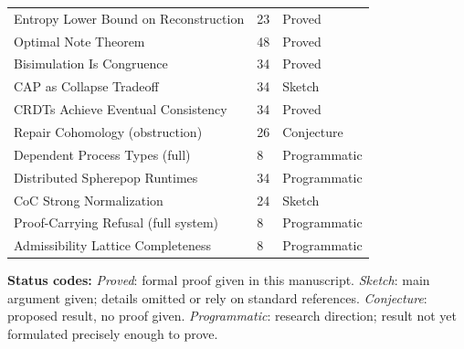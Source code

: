 \documentclass[12pt, a4paper, openany]{book}
\theoremstyle{plain}
\theoremstyle{definition}
\theoremstyle{remark}
\begin{document}
\begin{center}
\begin{longtable}{lll}
Entropy Lower Bound on Reconstruction & 23 & Proved \\
Optimal Note Theorem & 48 & Proved \\
Bisimulation Is Congruence & 34 & Proved \\
CAP as Collapse Tradeoff & 34 & Sketch \\
CRDTs Achieve Eventual Consistency & 34 & Proved \\
Repair Cohomology (obstruction) & 26 & Conjecture \\
Dependent Process Types (full) & 8 & Programmatic \\
Distributed Spherepop Runtimes & 34 & Programmatic \\
CoC Strong Normalization & 24 & Sketch \\
Proof-Carrying Refusal (full system) & 8 & Programmatic \\
Admissibility Lattice Completeness & 8 & Programmatic \\
\bottomrule
\end{longtable}
\end{center}

\noindent
\textbf{Status codes:}
\emph{Proved}: formal proof given in this manuscript.
\emph{Sketch}: main argument given; details omitted or rely on standard references.
\emph{Conjecture}: proposed result, no proof given.
\emph{Programmatic}: research direction; result not yet formulated precisely enough to prove.
\end{document}
